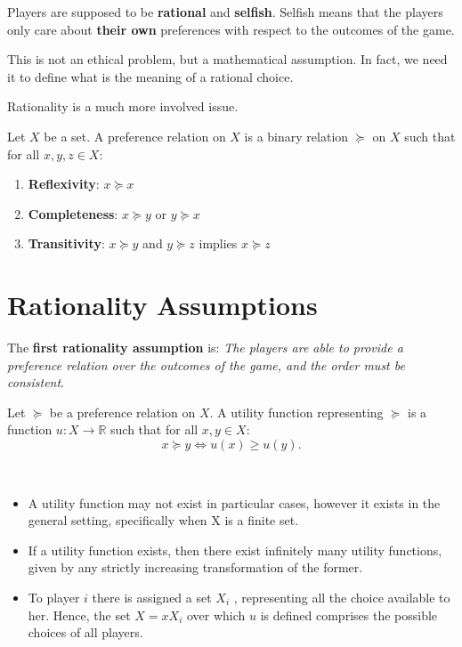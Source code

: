\documentclass[../main.tex]{subfiles}
\begin{document}
Players are supposed to be \textbf{rational} and \textbf{selfish}. Selfish means that the  players only care about \textbf{their own} preferences with respect to the outcomes of the game.

This is not an ethical problem, but a mathematical assumption. In fact, we need it to define what is the meaning of a rational choice.

Rationality is a much more involved issue.

\begin{definition}
    Let $X$ be a set. A preference relation on $X$ is a binary relation $\succeq$ on $X$ such that for all $x, y, z \in X$:
    \begin{enumerate}
        \item \textbf{Reflexivity}: $x \succeq x$
        \item \textbf{Completeness}: $x \succeq y$ or $y \succeq x$
        \item \textbf{Transitivity}: $x \succeq y$ and $y \succeq z$ implies $x \succeq z$
    \end{enumerate}
\end{definition}

\section{Rationality Assumptions}

The \textbf{first rationality assumption} is: \textit{The players are able to provide a preference relation over the outcomes of the game, and the order must be consistent}.

\begin{definition}
    Let $\succeq$ be a preference relation on $X$. A utility function representing $\succeq$ is a function $u: X \to \mathbb{R}$ such that for all $x, y \in X$:
    \[
        x \succeq y \iff u(x) \geq u(y).
    \]
\end{definition}
\begin{note}\
    \begin{itemize}
        \item A utility function may not exist in particular cases, however it exists in the general setting, specifically when X is a finite set.

        \item If a utility function exists, then there exist infinitely many utility functions, given by any strictly increasing transformation of the former.

        \item To player $i$ there is assigned a set $X_i$ , representing all the choice available to her. Hence, the set $X= x X_i$ over which $u$ is defined comprises the possible choices of all players.
    \end{itemize}
\end{note}
\end{document}
